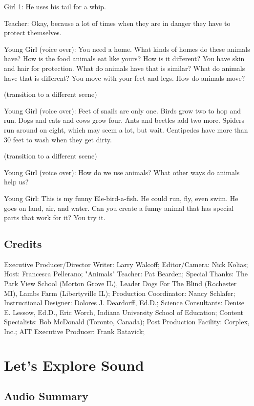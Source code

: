 Girl 1: He uses his tail for a whip.

Teacher: Okay, because a lot of times when they are in danger they have to protect themselves.

Young Girl (voice over): You need a home. What kinds of homes do these animals have? How is the food animals eat like yours? How is it different? You have skin and hair for protection. What do animals have that is similar? What do animals have that is different? You move with your feet and legs. How do animals move?

(transition to a different scene)

Young Girl (voice over): Feet of snails are only one. Birds grow two to hop and run. Dogs and cats and cows grow four. Ants and beetles add two more. Spiders run around on eight, which may seem a lot, but wait. Centipedes have more than 30 feet to wash when they get dirty.

(transition to a different scene)

Young Girl (voice over): How do we use animals? What other ways do animals help us?

Young Girl: This is my funny Ele-bird-a-fish. He could run, fly, even swim. He goes on land, air, and water. Can you create a funny animal that has special parts that work for it? You try it.

\subsection{Credits}

Executive Producer/Director Writer: Larry Walcoff;
Editor/Camera: Nick Kolias;
Host: Francesca Pellerano;
"Animals" Teacher: Pat Bearden;
Special Thanks: The Park View School (Morton Grove IL), Leader Dogs For The Blind (Rochester MI), Lambs Farm (Libertyville IL);
Production Coordinator: Nancy Schlafer;
Instructional Designer: Dolores J. Deardorff, Ed.D.;
Science Consultants: Denise E. Lessow, Ed.D., Eric Worch, Indiana University School of Education;
Content Specialists: Bob McDonald (Toronto, Canada);
Post Production Facility: Corplex, Inc.;
AIT Executive Producer: Frank Batavick;

\section{Let's Explore Sound}

\subsection{Audio Summary}

